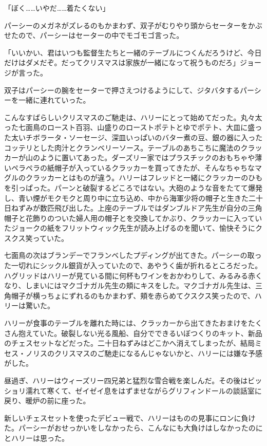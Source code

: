 \documentclass[10pt,a4paper]{article}
\begin{document}
\begin{CJK}{UTF8}{min}
「ぼく……いやだ……着たくない」

パーシーのメガネがズレるのもかまわず、双子がむりやり頭からセーターをかぶせたので、パーシーはセーターの中でモゴモゴ言った。

「いいかい、君はいつも監督生たちと一緒のテーブルにつくんだろうけど、今日だけはダメだぞ。だってクリスマスは家族が一緒になって祝うものだろ」ジョージが言った。

双子はパーシーの腕をセーターで押さえつけるようにして、ジタバタするパーシーを一緒に連れていった。



こんなすばらしいクリスマスのご馳走は、ハリーにとって始めてだった。丸々太った七面鳥のロースト百羽、山盛りのローストポテトとゆでポテト、大皿に盛った太いチボラータ・ソーセージ、深皿いっぱいのバター煮の豆、銀の器に入ったコッテリとした肉汁とクランベリーソース。テーブルのあちこちに魔法のクラッカーが山のように置いてあった。ダーズリー家ではプラスチックのおもちゃや薄いペラペラの紙帽子が入っているクラッカーを買ってきたが、そんなちゃちなマグルのクラッカーとはものが違う。ハリーはフレッドと一緒にクラッカーのひもを引っぱった。パーンと破裂するどころではない。大砲のような音をたてて爆発し、青い煙がモクモクと周り中に立ち込め、中から海軍少将の帽子と生きた二十日ねずみが数匹飛び出した。上座のテーブルではダンブルドア先生が自分の三角帽子と花飾りのついた婦人用の帽子とを交換してかぶり、クラッカーに入っていたジョークの紙をフリットウィック先生が読み上げるのを聞いて、愉快そうにクスクス笑っていた。

七面鳥の次はブランデーでフランベしたプディングが出てきた。パーシーの取った一切れにシックル銀貨が入っていたので、あやうく歯が折れるところだった。ハグリッドはハリーが見ている間に何杯もワインをおかわりして、みるみる赤くなり、しまいにはマクゴナガル先生の頬にキスをした。マクゴナガル先生は、三角帽子が横っちょにずれるのもかまわず、頬を赤らめてクスクス笑ったので、ハリーは驚いた。

ハリーが食事のテーブルを離れた時には、クラッカーから出てきたおまけをたくさん抱えていた。破裂しない光る風船、自分でできるいぼつくりのキット、新品のチェスセットなどだった。二十日ねずみはどこかへ消えてしまったが、結局ミセス・ノリスのクリスマスのご馳走になるんじゃないかと、ハリーには嫌な予感がした。

昼過ぎ、ハリーはウィーズリー四兄弟と猛烈な雪合戦を楽しんだ。その後はビッショリ濡れて寒くて、ゼイゼイ息をはずませながらグリフィンドールの談話室に戻り、暖炉の前に座った。

新しいチェスセットを使ったデビュー戦で、ハリーはものの見事にロンに負けた。パーシーがおせっかいをしなかったら、こんなにも大負けはしなかったのにとハリーは思った。


\end{CJK}
\end{document}
